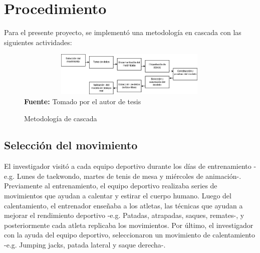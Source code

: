 \section{Procedimiento}
Para el presente proyecto, se implement\'o una metodolog\'ia en cascada con las siguientes  actividades:
\begin{figure}[H]
	\caption{Metodolog\'ia de cascada}
	\label{fig:segVideo}
	\centering
	\includegraphics[width=420px,height=80px]{graphics/cascada.PNG} \\
	\textbf{Fuente:} Tomado por el autor de tesis
\end{figure} 
\subsection{Selecci\'on del movimiento}
El investigador visit\'o a cada equipo deportivo durante los d\'ias de entrenamiento -e.g. Lunes de taekwondo, martes de tenis de mesa y mi\'ercoles de animaci\'on-.  Previamente al entrenamiento, el equipo deportivo realizaba series de movimientos que ayudan a calentar y estirar el cuerpo humano.  Luego del calentamiento, el entrenador ense\~naba a los atletas, las t\'ecnicas que ayudan a mejorar el rendimiento deportivo -e.g. Patadas, atrapadas, saques, remates-, y posteriormente cada atleta replicaba los movimientos. Por \'ultimo, el investigador con la ayuda del equipo deportivo, seleccionaron un movimiento de calentamiento -e.g. Jumping jacks, patada lateral y saque derecha-.
